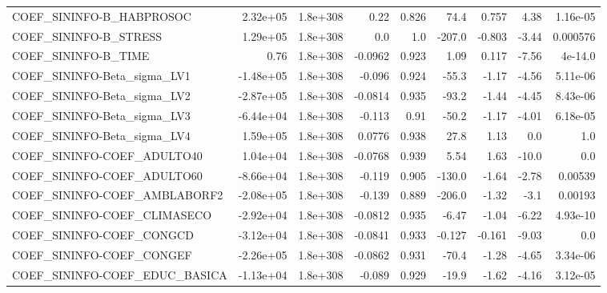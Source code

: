 \begin{tabular}{lrrrrrrrr}
COEF\_SININFO-B\_HABPROSOC          &    2.32e+05 &     1.8e+308 &    0.22 &    0.826 &       74.4 &       0.757 &         4.38 &      1.16e-05 \\
COEF\_SININFO-B\_STRESS             &    1.29e+05 &     1.8e+308 &     0.0 &      1.0 &     -207.0 &      -0.803 &        -3.44 &      0.000576 \\
COEF\_SININFO-B\_TIME               &        0.76 &     1.8e+308 & -0.0962 &    0.923 &       1.09 &       0.117 &        -7.56 &       4e-14.0 \\
COEF\_SININFO-Beta\_sigma\_LV1       &   -1.48e+05 &     1.8e+308 &  -0.096 &    0.924 &      -55.3 &       -1.17 &        -4.56 &      5.11e-06 \\
COEF\_SININFO-Beta\_sigma\_LV2       &   -2.87e+05 &     1.8e+308 & -0.0814 &    0.935 &      -93.2 &       -1.44 &        -4.45 &      8.43e-06 \\
COEF\_SININFO-Beta\_sigma\_LV3       &   -6.44e+04 &     1.8e+308 &  -0.113 &     0.91 &      -50.2 &       -1.17 &        -4.01 &      6.18e-05 \\
COEF\_SININFO-Beta\_sigma\_LV4       &    1.59e+05 &     1.8e+308 &  0.0776 &    0.938 &       27.8 &        1.13 &          0.0 &           1.0 \\
COEF\_SININFO-COEF\_ADULTO40        &    1.04e+04 &     1.8e+308 & -0.0768 &    0.939 &       5.54 &        1.63 &        -10.0 &           0.0 \\
COEF\_SININFO-COEF\_ADULTO60        &   -8.66e+04 &     1.8e+308 &  -0.119 &    0.905 &     -130.0 &       -1.64 &        -2.78 &       0.00539 \\
COEF\_SININFO-COEF\_AMBLABORF2      &   -2.08e+05 &     1.8e+308 &  -0.139 &    0.889 &     -206.0 &       -1.32 &         -3.1 &       0.00193 \\
COEF\_SININFO-COEF\_CLIMASECO       &   -2.92e+04 &     1.8e+308 & -0.0812 &    0.935 &      -6.47 &       -1.04 &        -6.22 &      4.93e-10 \\
COEF\_SININFO-COEF\_CONGCD          &   -3.12e+04 &     1.8e+308 & -0.0841 &    0.933 &     -0.127 &      -0.161 &        -9.03 &           0.0 \\
COEF\_SININFO-COEF\_CONGEF          &   -2.26e+05 &     1.8e+308 & -0.0862 &    0.931 &      -70.4 &       -1.28 &        -4.65 &      3.34e-06 \\
COEF\_SININFO-COEF\_EDUC\_BASICA     &   -1.13e+04 &     1.8e+308 &  -0.089 &    0.929 &      -19.9 &       -1.62 &        -4.16 &      3.12e-05 \\

\end{tabular}
